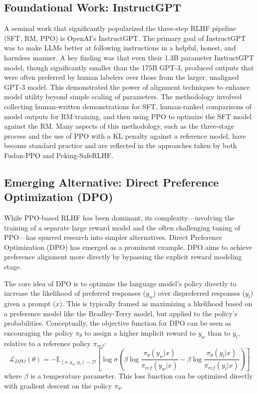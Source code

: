 \documentclass[10pt,journal,compsoc]{IEEEtran} %
\begin{document}
\subsection{Foundational Work: InstructGPT}
A seminal work that significantly popularized the three-step RLHF pipeline (SFT, RM, PPO) is OpenAI's InstructGPT. \cite{Ouyang2022InstructGPT} The primary goal of InstructGPT was to make LLMs better at following instructions in a helpful, honest, and harmless manner. A key finding was that even their 1.3B parameter InstructGPT model, though significantly smaller than the 175B GPT-3, produced outputs that were often preferred by human labelers over those from the larger, unaligned GPT-3 model. \cite{Ouyang2022InstructGPT} This demonstrated the power of alignment techniques to enhance model utility beyond simple scaling of parameters. The methodology involved collecting human-written demonstrations for SFT, human-ranked comparisons of model outputs for RM training, and then using PPO to optimize the SFT model against the RM. \cite{Ouyang2022InstructGPT} Many aspects of this methodology, such as the three-stage process and the use of PPO with a KL penalty against a reference model, have become standard practice and are reflected in the approaches taken by both Fudan-PPO and Peking-SafeRLHF.

\subsection{Emerging Alternative: Direct Preference Optimization (DPO)}
While PPO-based RLHF has been dominant, its complexity—involving the training of a separate large reward model and the often challenging tuning of PPO—has spurred research into simpler alternatives. Direct Preference Optimization (DPO) has emerged as a prominent example. \cite{Rafailov2023DPO, Amini2024DPOOffset} DPO aims to achieve preference alignment more directly by bypassing the explicit reward modeling stage.

The core idea of DPO is to optimize the language model's policy directly to increase the likelihood of preferred responses ($y_w$) over dispreferred responses ($y_l$) given a prompt ($x$). This is typically framed as maximizing a likelihood based on a preference model like the Bradley-Terry model, but applied to the policy's probabilities. Conceptually, the objective function for DPO can be seen as encouraging the policy $\pi_\theta$ to assign a higher implicit reward to $y_w$ than to $y_l$, relative to a reference policy $\pi_{ref}$:
$$ \mathcal{L}_{DPO}(\theta) = -\mathbb{E}_{(x, y_w, y_l) \sim \mathcal{D}} \left[\log \sigma\left(\beta \log \frac{\pi_\theta(y_w|x)}{\pi_{ref}(y_w|x)} - \beta \log \frac{\pi_\theta(y_l|x)}{\pi_{ref}(y_l|x)}\right)\right] $$
where $\beta$ is a temperature parameter. This loss function can be optimized directly with gradient descent on the policy $\pi_\theta$.
\end{document}
